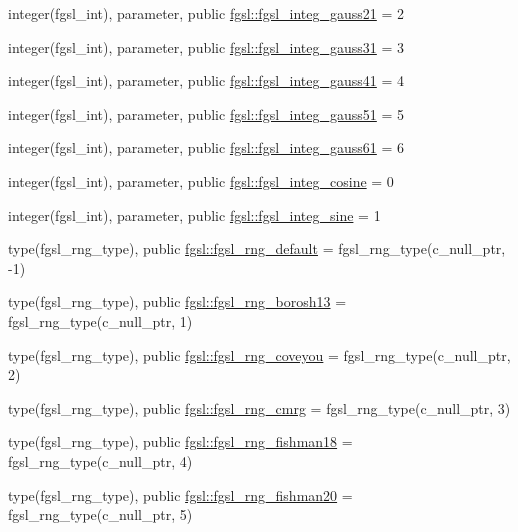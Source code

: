\begin{DoxyCompactItemize}
\item 
integer(fgsl\+\_\+int), parameter, public \hyperlink{namespacefgsl_a3c4e8f9478c6a8ab3bab6580929c8894}{fgsl\+::fgsl\+\_\+integ\+\_\+gauss21} = 2
\item 
integer(fgsl\+\_\+int), parameter, public \hyperlink{namespacefgsl_a6fd868988f11aa3c2ab7c6a3d60ab1a0}{fgsl\+::fgsl\+\_\+integ\+\_\+gauss31} = 3
\item 
integer(fgsl\+\_\+int), parameter, public \hyperlink{namespacefgsl_a5c219f8f951d411c63849088e0e224da}{fgsl\+::fgsl\+\_\+integ\+\_\+gauss41} = 4
\item 
integer(fgsl\+\_\+int), parameter, public \hyperlink{namespacefgsl_a8331538c5a42b13f0893e34864bae6d7}{fgsl\+::fgsl\+\_\+integ\+\_\+gauss51} = 5
\item 
integer(fgsl\+\_\+int), parameter, public \hyperlink{namespacefgsl_ac82cf20c4bb7b1f3a6053020016abfed}{fgsl\+::fgsl\+\_\+integ\+\_\+gauss61} = 6
\item 
integer(fgsl\+\_\+int), parameter, public \hyperlink{namespacefgsl_a32ea398e71abe5dd44ef510e11dcfa87}{fgsl\+::fgsl\+\_\+integ\+\_\+cosine} = 0
\item 
integer(fgsl\+\_\+int), parameter, public \hyperlink{namespacefgsl_a4cc7312b9db6359e7b0cdc32f98ce88d}{fgsl\+::fgsl\+\_\+integ\+\_\+sine} = 1
\item 
type(fgsl\+\_\+rng\+\_\+type), public \hyperlink{namespacefgsl_ab8c31f8079ad3a768a528cd525c8ccf2}{fgsl\+::fgsl\+\_\+rng\+\_\+default} = fgsl\+\_\+rng\+\_\+type(c\+\_\+null\+\_\+ptr, -\/1)
\item 
type(fgsl\+\_\+rng\+\_\+type), public \hyperlink{namespacefgsl_afcf3a859944205f1a11e0dc35e13e608}{fgsl\+::fgsl\+\_\+rng\+\_\+borosh13} = fgsl\+\_\+rng\+\_\+type(c\+\_\+null\+\_\+ptr, 1)
\item 
type(fgsl\+\_\+rng\+\_\+type), public \hyperlink{namespacefgsl_a8eb316ba1f0e42680fb05bf4444f3018}{fgsl\+::fgsl\+\_\+rng\+\_\+coveyou} = fgsl\+\_\+rng\+\_\+type(c\+\_\+null\+\_\+ptr, 2)
\item 
type(fgsl\+\_\+rng\+\_\+type), public \hyperlink{namespacefgsl_a46ec4ab895207c6e3da1a2adb29bb0ff}{fgsl\+::fgsl\+\_\+rng\+\_\+cmrg} = fgsl\+\_\+rng\+\_\+type(c\+\_\+null\+\_\+ptr, 3)
\item 
type(fgsl\+\_\+rng\+\_\+type), public \hyperlink{namespacefgsl_a8f22f1b0b7e5d37d485553834c96b959}{fgsl\+::fgsl\+\_\+rng\+\_\+fishman18} = fgsl\+\_\+rng\+\_\+type(c\+\_\+null\+\_\+ptr, 4)
\item 
type(fgsl\+\_\+rng\+\_\+type), public \hyperlink{namespacefgsl_aaa1400ecb0b7757a72553cd766ac5880}{fgsl\+::fgsl\+\_\+rng\+\_\+fishman20} = fgsl\+\_\+rng\+\_\+type(c\+\_\+null\+\_\+ptr, 5)

\end{DoxyCompactItemize}
